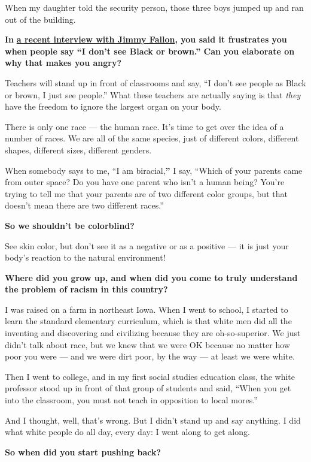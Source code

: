When my daughter told the security person, those three boys jumped up
and ran out of the building.

\textbf{In} \textbf{\href{https://www.youtube.com/watch?v=f2z-ahJ4uws}{a
recent interview with Jimmy Fallon}, you said it frustrates you when
people say ``I don't see Black or brown.'' Can you elaborate on why that
makes you angry?}

Teachers will stand up in front of classrooms and say, ``I don't see
people as Black or brown, I just see people.'' What these teachers are
actually saying is that \emph{they} have the freedom to ignore the
largest organ on your body.

There is only one race --- the human race. It's time to get over the
idea of a number of races. We are all of the same species, just of
different colors, different shapes, different sizes, different genders.

When somebody says to me, ``I am biracial,\textbf{''} I say, ``Which of
your parents came from outer space? Do you have one parent who isn't a
human being? You're trying to tell me that your parents are of two
different color groups, but that doesn't mean there are two different
races.''

\textbf{So we shouldn't be colorblind?}

See skin color, but don't see it as a negative or as a positive --- it
is just your body's reaction to the natural environment!

\textbf{Where did you grow up, and when did you come to truly understand
the problem of racism in this country?}

I was raised on a farm in northeast Iowa. When I went to school, I
started to learn the standard elementary curriculum, which is that white
men did all the inventing and discovering and civilizing because they
are oh-so-superior. We just didn't talk about race, but we knew that we
were OK because no matter how poor you were --- and we were dirt poor,
by the way --- at least we were white.

Then I went to college, and in my first social studies education class,
the white professor stood up in front of that group of students and
said, ``When you get into the classroom, you must not teach in
opposition to local mores.''

And I thought, well, that's wrong. But I didn't stand up and say
anything. I did what white people do all day, every day: I went along to
get along.

\textbf{So when did you start pushing back?}

